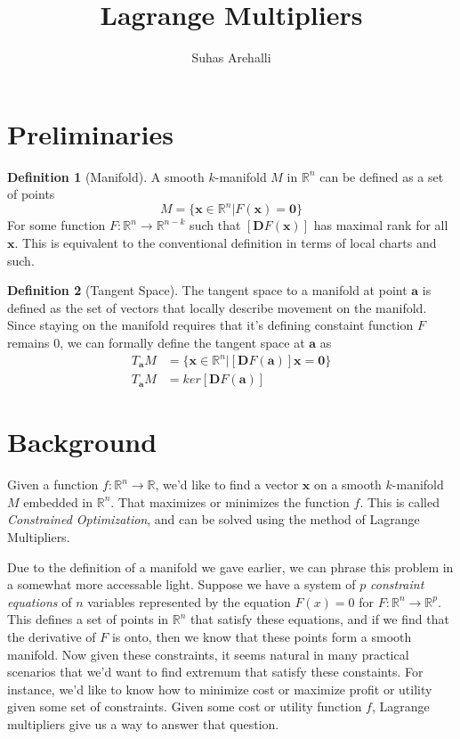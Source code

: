 \documentclass[11pt]{article}
\title{Lagrange Multipliers}
\author{Suhas Arehalli}
\theoremstyle{definition}
\newtheorem{definition}{Definition}[section]
\begin{document}
\maketitle

\section{Preliminaries}
\begin{definition}[Manifold]
    A smooth $k$-manifold $M$ in $\mathbb{R}^n$ can be defined as a set of points
    \[ M = \{ \mathbf{x} \in \mathbb{R}^n | F(\mathbf{x}) = \mathbf{0}\} \]
    For some function $F: \mathbb{R}^n \rightarrow \mathbb{R}^{n-k}$ such that
    $\left[\mathbf{D}F(\mathbf{x})\right]$ has maximal rank for all $\mathbf{x}$. 
    This is equivalent to the conventional definition in terms of local charts and 
    such.
\end{definition}
\begin{definition}[Tangent Space]
    The tangent space to a manifold at point $\mathbf{a}$ is defined as the set of vectors
    that locally describe movement on the manifold. Since staying on the manifold requires 
    that it's defining constaint function $F$ remains 0, we can formally define the tangent
    space at $\mathbf{a}$ as
    \begin{align*}
        T_{\mathbf{a}}M &= \{ \mathbf{x} \in \mathbb{R}^n | [\mathbf{D}F(\mathbf{a})]\mathbf{x} = \mathbf{0}\} \\
        T_{\mathbf{a}}M &= ker[\mathbf{D}F(\mathbf{a})]
    \end{align*}
\end{definition}
\section{Background}
Given a function $f: \mathbb{R}^n \rightarrow \mathbb{R}$, we'd like to find a vector $\mathbf{x}$ on
a smooth $k$-manifold $M$ embedded in $\mathbb{R}^n$. That maximizes or minimizes the function $f$. This
is called \textit{Constrained Optimization}, and can be solved using the method of Lagrange Multipliers.

Due to the definition of a manifold we gave earlier, we can phrase this problem in a somewhat more 
accessable light. Suppose we have a system of $p$ \textit{constraint equations} of $n$ variables  
represented by the equation $F(x) = 0$ for  $F: \mathbb{R}^n \rightarrow \mathbb{R}^{p}$. This 
defines a set of points in $\mathbb{R}^n$ that satisfy these equations, and if we find that 
the derivative of $F$ is onto, then we know that these points form a smooth manifold. Now given
these constraints, it seems natural in many practical scenarios that we'd want to find extremum
that satisfy these constaints. For instance, we'd like to know how to minimize cost or maximize
profit or utility given some set of constraints. Given some cost or utility function $f$, Lagrange
multipliers give us a way to answer that question.
\end{document}
